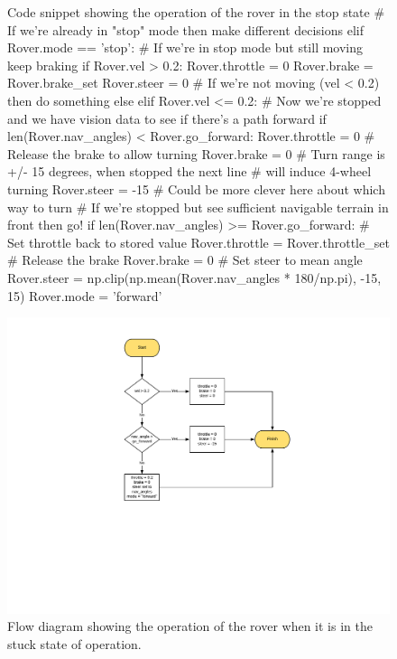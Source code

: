 \documentclass[a4paper]{article}
\begin{document}
\begin{figure}[h]\scriptsize
\begin{sexylisting}{Code snippet showing the operation of the rover in the stop state}
# If we're already in "stop" mode then make different decisions
        elif Rover.mode == 'stop':
            # If we're in stop mode but still moving keep braking
            if Rover.vel > 0.2:
                Rover.throttle = 0
                Rover.brake = Rover.brake_set
                Rover.steer = 0
            # If we're not moving (vel < 0.2) then do something else
            elif Rover.vel <= 0.2:
                # Now we're stopped and we have vision data to see if there's a path forward
                if len(Rover.nav_angles) < Rover.go_forward:
                    Rover.throttle = 0
                    # Release the brake to allow turning
                    Rover.brake = 0
                    # Turn range is +/- 15 degrees, when stopped the next line
                    # will induce 4-wheel turning
                    Rover.steer = -15 # Could be more clever here about which way to turn
                # If we're stopped but see sufficient navigable terrain in front then go!
                if len(Rover.nav_angles) >= Rover.go_forward:
                    # Set throttle back to stored value
                    Rover.throttle = Rover.throttle_set
                    # Release the brake
                    Rover.brake = 0
                    # Set steer to mean angle
                    Rover.steer = np.clip(np.mean(Rover.nav_angles * 180/np.pi), -15, 15)
                    Rover.mode = 'forward'
\end{sexylisting}
\end{figure}

\begin{figure}
\hspace{-1.5cm}
\includegraphics[scale=0.7]{stop_flow}
\caption{Flow diagram showing the operation of the rover when it is in the stuck state of operation.}
\end{figure}
\end{document}
